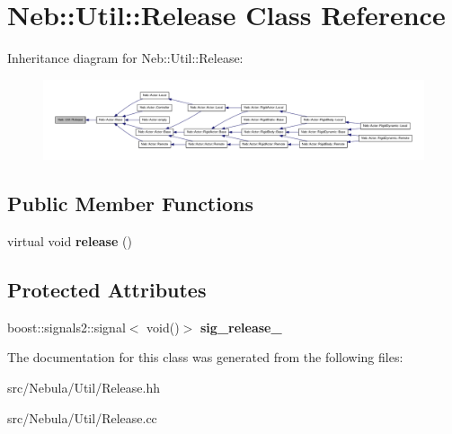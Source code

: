 \hypertarget{classNeb_1_1Util_1_1Release}{\section{\-Neb\-:\-:\-Util\-:\-:\-Release \-Class \-Reference}
\label{classNeb_1_1Util_1_1Release}
}


\-Inheritance diagram for \-Neb\-:\-:\-Util\-:\-:\-Release\-:\nopagebreak
\begin{figure}[H]
\begin{center}
\leavevmode
\includegraphics[width=350pt]{classNeb_1_1Util_1_1Release__inherit__graph}
\end{center}
\end{figure}
\subsection*{\-Public \-Member \-Functions}
\begin{DoxyCompactItemize}
\item 
\hypertarget{classNeb_1_1Util_1_1Release_a42b6f764403cec132885a62592cac030}{virtual void {\bfseries release} ()}\label{classNeb_1_1Util_1_1Release_a42b6f764403cec132885a62592cac030}

\end{DoxyCompactItemize}
\subsection*{\-Protected \-Attributes}
\begin{DoxyCompactItemize}
\item 
\hypertarget{classNeb_1_1Util_1_1Release_a866d7815fa91929b3fdf820bedd400d7}{boost\-::signals2\-::signal$<$ void()$>$ {\bfseries sig\-\_\-release\-\_\-}}\label{classNeb_1_1Util_1_1Release_a866d7815fa91929b3fdf820bedd400d7}

\end{DoxyCompactItemize}


\-The documentation for this class was generated from the following files\-:\begin{DoxyCompactItemize}
\item 
src/\-Nebula/\-Util/\-Release.\-hh\item 
src/\-Nebula/\-Util/\-Release.\-cc\end{DoxyCompactItemize}

